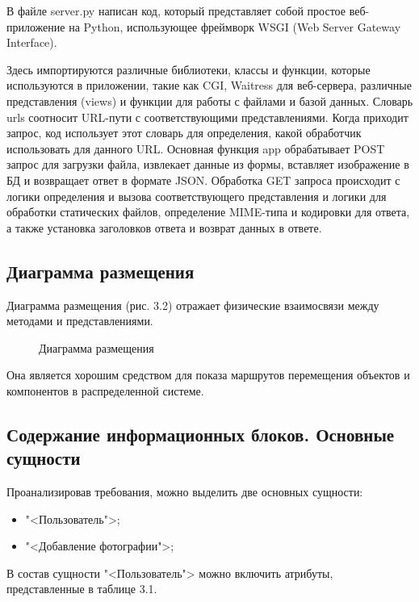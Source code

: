 В файле server.py написан код, который представляет собой простое веб-приложение на Python, использующее фреймворк WSGI (Web Server Gateway Interface).

Здесь импортируются различные библиотеки, классы и функции, которые используются в приложении, такие как CGI, Waitress для веб-сервера, различные представления (views) и функции для работы с файлами и базой данных. Словарь urls соотносит URL-пути с соответствующими представлениями. Когда приходит запрос, код использует этот словарь для определения, какой обработчик использовать для данного URL. Основная функция app обрабатывает POST запрос для загрузки файла, извлекает данные из формы, вставляет изображение в БД и возвращает ответ в формате JSON. Обработка GET запроса происходит с логики определения и вызова соответствующего представления и логики для обработки статических файлов, определение MIME-типа и кодировки для ответа, а также установка заголовков ответа и возврат данных в ответе.

\subsection{Диаграмма размещения}

Диаграмма размещения (рис. 3.2) отражает физические взаимосвязи между методами и представлениями.

\begin{figure}[ht]
	\caption{Диаграмма размещения}
	\label{place:image}
\end{figure}

Она является хорошим средством для показа маршрутов перемещения объектов и компонентов в распределенной системе.

\subsection{Содержание информационных блоков. Основные сущности}

Проанализировав требования, можно выделить две основных сущности:
\begin{itemize}
	\item "<Пользователь">;
	\item "<Добавление фотографии">;
\end{itemize}

В состав сущности "<Пользователь"> можно включить атрибуты, представленные в таблице 3.1.

